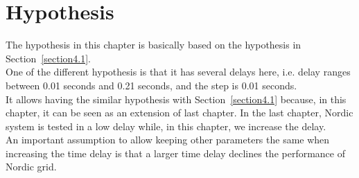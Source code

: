 \section{Hypothesis} %
The hypothesis in this chapter is basically based on the hypothesis in Section~\ref{section4.1}.  \\
 
One of the different hypothesis is that it has several delays here, i.e. delay ranges between 0.01 seconds and 0.21 seconds, and the step is 0.01 seconds.  \\

It allows having the similar hypothesis with Section~\ref{section4.1} because, in this chapter, it can be seen as an extension of last chapter. In the last chapter, Nordic system is tested in a low delay while, in this chapter, we increase the delay. \\ 

An important assumption to allow keeping other parameters the same when increasing the time delay is that a larger time delay declines the performance of Nordic grid.\\